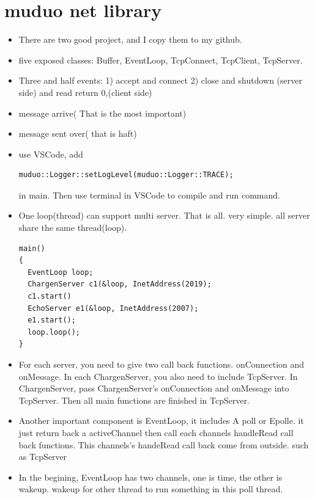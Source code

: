 \documentclass[a4paper,11pt,twoside]{book}
\begin{document}
\chapter{muduo net library}
\begin{itemize}
	
	\item There are two good project, and I copy them to my github. 	
	
    \item five exposed classes: Buffer, EventLoop, TcpConnect, TcpClient, TcpServer.
    \item Three and half events: 1) accept and connect 2) close and shutdown (server side) and read return 0,(client side)
    \item message arrive( That is the most important) 
    \item message sent over( that is haft)

    \item use VSCode, add 
\begin{lstlisting}[]
muduo::Logger::setLogLevel(muduo::Logger::TRACE); 
\end{lstlisting}
in main. Then use terminal in VSCode to compile and run command. 

    \item One loop(thread) can support multi server.  That is all. very simple. all server share the same thread(loop).
\begin{lstlisting}[]
main()
{
  EventLoop loop;
  ChargenServer c1(&loop, InetAddress(2019);
  c1.start()
  EchoServer e1(&loop, InetAddress(2007);
  e1.start();
  loop.loop();
}
\end{lstlisting}
\item For each server, you need to give two call back functions. 
onConnection and onMessage. In each ChargenServer, you also need to include TcpServer.  In ChargenServer, pass ChargenServer's onConnection and onMessage into TcpServer. Then all main functions are finished in TcpServer. 

\item Another important component is EventLoop, it includes A poll or Epolle. it just return back a activeChannel then call each channels handleRead call back functions.  This channels's handeRead call back come from outside. such as TcpServer


\item In the begining, EventLoop has two channels, one is time, the other is wakeup.  wakeup for other thread to run something in this poll thread. 


\end{itemize}
\end{document}
